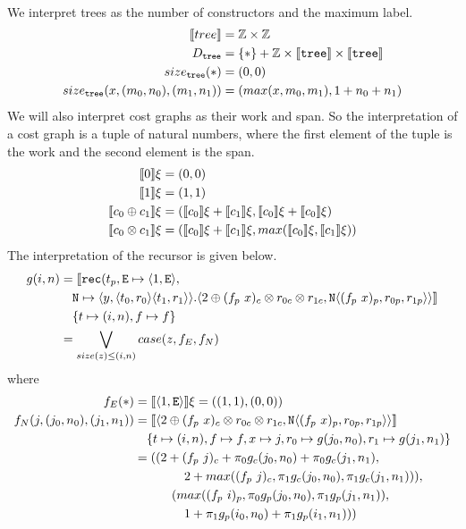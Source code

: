 \paragraph{}
We interpret trees as the number of  constructors and the maximum label.
%
\begin{align*}
  \llbracket tree \rrbracket &= \mathbb{Z} \times \mathbb{Z} \\
  D_{\texttt{tree}} &= \{\ast\} + \mathbb{Z} \times \llbracket \texttt{tree} \rrbracket \times \llbracket \texttt{tree} \rrbracket \\
  size_{\texttt{tree}}(\ast) &= (0, 0) \\
  size_{\texttt{tree}}(x, (m_0, n_0), (m_1, n_1)) &= (max(x, m_0, m_1), 1 + n_0 + n_1)
\end{align*}
%
We will also interpret cost graphs as their work and span. So the
interpretation of a cost graph is a tuple of natural numbers, where the first
element of the tuple is the work and the second element is the span.
%
\begin{align*}
  \llbracket 0 \rrbracket\xi &= (0,0) \\
  \llbracket 1 \rrbracket\xi &= (1,1) \\
  \llbracket c_0 \oplus c_1 \rrbracket\xi &= (\llbracket c_0 \rrbracket\xi + \llbracket c_1 \rrbracket\xi, \llbracket c_0 \rrbracket\xi + \llbracket c_0 \rrbracket \xi)\\
  \llbracket c_0 \otimes c_1 \rrbracket\xi &= (\llbracket c_0 \rrbracket\xi + \llbracket c_1 \rrbracket\xi, max(\llbracket c_0 \rrbracket\xi, \llbracket c_1 \rrbracket\xi))
\end{align*}
%
The interpretation of the recursor is given below.
%
\begin{align*}
  g(i,n) &= \llbracket \texttt{rec}(t_p, \texttt{E} \mapsto \langle 1, \texttt{E}\rangle, \\
         &\quad \texttt{N} \mapsto \langle y, \langle t_0, r_0 \rangle \langle t_1, r_1 \rangle \rangle.  \langle 2 \oplus (f_p\ x)_c \otimes r_{0c} \otimes r_{1c}, \texttt{N} \langle (f_p\ x)_p, r_{0p}, r_{1p}\rangle\rangle \rrbracket\\
         &\quad \{t \mapsto (i,n), f \mapsto f \} \\
         &= \bigvee\limits_{size(z) \leq (i,n)} case(z, f_E, f_N)
\end{align*}
where
\begin{align*}
  f_E(\ast) &= \llbracket \langle 1, \texttt{E} \rangle\rrbracket\xi = ((1, 1), (0, 0)) \\
  f_N(j, (j_0,n_0), (j_1, n_1)) &= \llbracket \langle 2 \oplus (f_p\ x)_c \otimes r_{0c} \otimes r_{1c}, \texttt{N} \langle (f_p\ x)_p, r_{0p}, r_{1p}\rangle\rangle \rrbracket\\
                                &\quad \{t \mapsto (i,n), f \mapsto f, x \mapsto j, r_0 \mapsto g(j_0,n_0), r_1 \mapsto g(j_1,n_1) \} \\
                                &= ((2 + (f_p\ j)_c + \pi_0g_c(j_0,n_0) +\pi_0 g_c(j_1,n_1), \\
                                &\qquad\quad\quad 2 + max((f_p\ j)_c,\pi_1 g_c(j_0,n_0), \pi_1 g_c(j_1,n_1))),\\
                                &\qquad\quad (max((f_p\ i)_p, \pi_0 g_p(j_0,n_0), \pi_1 g_p(j_1,n_1)), \\
                                &\qquad\quad\quad 1 + \pi_1 g_p(i_0,n_0) + \pi_1 g_p(i_1,n_1)))
\end{align*}
